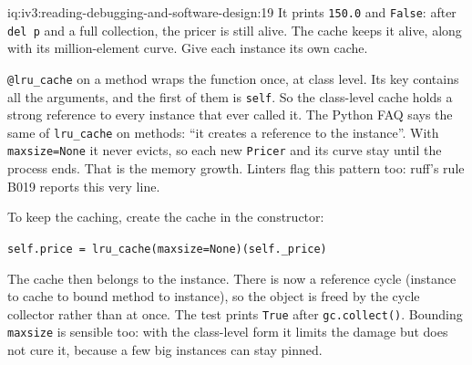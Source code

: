 \begin{solution}{iq:iv3:reading-debugging-and-software-design:19}
It prints \texttt{150.0} and \texttt{False}: after \texttt{del p} and a full collection, the pricer is still alive. The cache keeps it alive, along with its million-element curve. Give each instance its own cache.

\texttt{@lru\_cache} on a method wraps the function once, at class level. Its key contains all the arguments, and the first of them is \texttt{self}. So the class-level cache holds a strong reference to every instance that ever called it. The Python FAQ says the same of \texttt{lru\_cache} on methods: ``it creates a reference to the instance''. With \texttt{maxsize=None} it never evicts, so each new \texttt{Pricer} and its curve stay until the process ends. That is the memory growth. Linters flag this pattern too: ruff's rule B019 reports this very line.

To keep the caching, create the cache in the constructor:

\texttt{self.price = lru\_cache(maxsize=None)(self.\_price)}

The cache then belongs to the instance. There is now a reference cycle (instance to cache to bound method to instance), so the object is freed by the cycle collector rather than at once. The test prints \texttt{True} after \texttt{gc.collect()}. Bounding \texttt{maxsize} is sensible too: with the class-level form it limits the damage but does not cure it, because a few big instances can stay pinned.


\end{solution}

